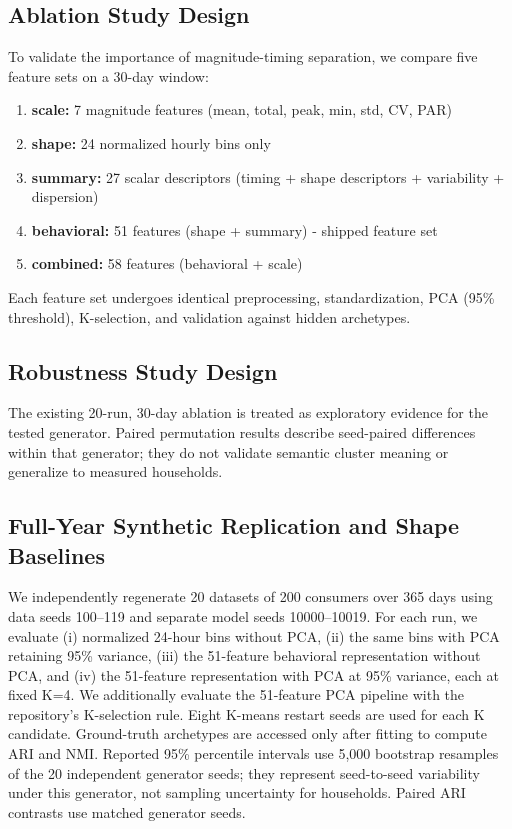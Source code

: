 \documentclass[11pt,a4paper]{article}
\begin{document}
\subsection{Ablation Study Design}

To validate the importance of magnitude-timing separation, we compare five feature sets on a 30-day window:

\begin{enumerate}
    \item \textbf{scale:} 7 magnitude features (mean, total, peak, min, std, CV, PAR)
    \item \textbf{shape:} 24 normalized hourly bins only
    \item \textbf{summary:} 27 scalar descriptors (timing + shape descriptors + variability + dispersion)
    \item \textbf{behavioral:} 51 features (shape + summary) - shipped feature set
    \item \textbf{combined:} 58 features (behavioral + scale)
\end{enumerate}

Each feature set undergoes identical preprocessing, standardization, PCA (95\% threshold), K-selection, and validation against hidden archetypes.

\subsection{Robustness Study Design}

The existing 20-run, 30-day ablation is treated as exploratory evidence for the tested generator. Paired permutation results describe seed-paired differences within that generator; they do not validate semantic cluster meaning or generalize to measured households.

\subsection{Full-Year Synthetic Replication and Shape Baselines}

We independently regenerate 20 datasets of 200 consumers over 365 days using data seeds 100--119 and separate model seeds 10000--10019. For each run, we evaluate (i) normalized 24-hour bins without PCA, (ii) the same bins with PCA retaining 95\% variance, (iii) the 51-feature behavioral representation without PCA, and (iv) the 51-feature representation with PCA at 95\% variance, each at fixed K=4. We additionally evaluate the 51-feature PCA pipeline with the repository's K-selection rule. Eight K-means restart seeds are used for each K candidate. Ground-truth archetypes are accessed only after fitting to compute ARI and NMI. Reported 95\% percentile intervals use 5,000 bootstrap resamples of the 20 independent generator seeds; they represent seed-to-seed variability under this generator, not sampling uncertainty for households. Paired ARI contrasts use matched generator seeds.
\end{document}
